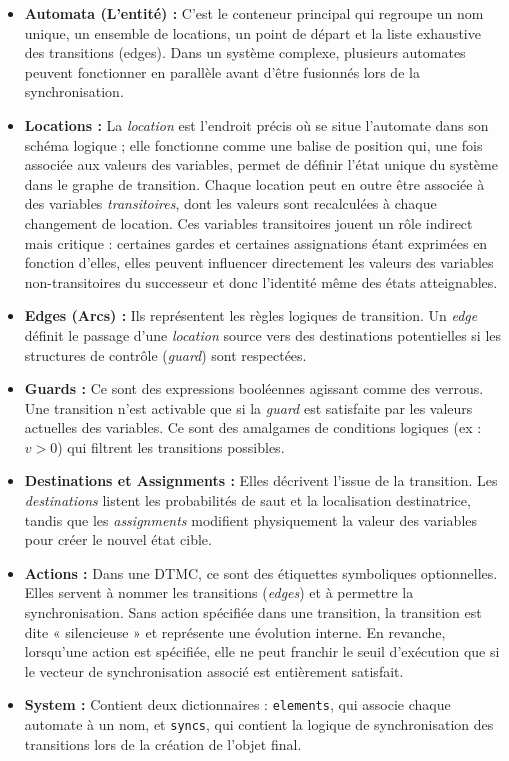 \documentclass[14pt, a4paper]{extarticle}
\begin{document}
\begin{itemize}
  \item \textbf{Automata (L'entité) :} C'est le conteneur principal qui regroupe un nom unique, un ensemble de locations, un point de départ et la liste exhaustive des transitions (edges). Dans un système complexe, plusieurs automates peuvent fonctionner en parallèle avant d'être fusionnés lors de la synchronisation.
  \item \textbf{Locations :} La \textit{location} est l'endroit précis où se situe l'automate dans son schéma logique ; elle fonctionne comme une balise de position qui, une fois associée aux valeurs des variables, permet de définir l'état unique du système dans le graphe de transition. Chaque location peut en outre être associée à des variables \textit{transitoires}, dont les valeurs sont recalculées à chaque changement de location. Ces variables transitoires jouent un rôle indirect mais critique : certaines gardes et certaines assignations étant exprimées en fonction d'elles, elles peuvent influencer directement les valeurs des variables non-transitoires du successeur et donc l'identité même des états atteignables.
\item \textbf{Edges (Arcs) :} Ils représentent les règles logiques de transition. Un \textit{edge} définit le passage d'une \textit{location} source vers des destinations potentielles si les structures de contrôle (\textit{guard}) sont respectées.
\item \textbf{Guards :} Ce sont des expressions booléennes agissant comme des verrous. Une transition n'est activable que si la \textit{guard} est satisfaite par les valeurs actuelles des variables. Ce sont des amalgames de conditions logiques (ex : $v > 0$) qui filtrent les transitions possibles.
\item \textbf{Destinations et Assignments :} Elles décrivent l'issue de la transition. Les \textit{destinations} listent les probabilités de saut et la localisation destinatrice, tandis que les \textit{assignments} modifient physiquement la valeur des variables pour créer le nouvel état cible.
\item \textbf{Actions :} Dans une DTMC, ce sont des étiquettes symboliques optionnelles. Elles servent à nommer les transitions (\textit{edges}) et à permettre la synchronisation. Sans action spécifiée dans une transition, la transition est dite « silencieuse » et représente une évolution interne. En revanche, lorsqu'une action est spécifiée, elle ne peut franchir le seuil d'exécution que si le vecteur de synchronisation associé est entièrement satisfait.
\item \textbf{System :} Contient deux dictionnaires : \texttt{elements}, qui associe chaque automate à un nom, et \texttt{syncs}, qui contient la logique de synchronisation des transitions lors de la création de l'objet final.
\end{itemize}
\end{document}
